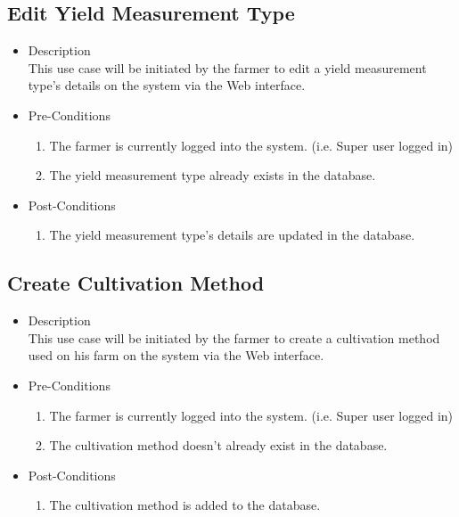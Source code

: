 \documentclass[11pt,fleqn]{book} %
\begin{document}
	\subsection{Edit Yield Measurement Type}
	\begin{itemize}
		\item Description\\
		This use case will be initiated by the farmer to edit a yield measurement type’s details on the system via the Web interface.
		\item Pre-Conditions
		\begin{enumerate}
			\item The farmer is currently logged into the system. (i.e. Super user logged in)
			\item The yield measurement type already exists in the database.					
		\end{enumerate}
		\item Post-Conditions
		\begin{enumerate}
			\item The yield measurement type’s details are updated in the database.
		\end{enumerate}
	\end{itemize}
	
	\subsection{Create Cultivation Method}
	\begin{itemize}
		\item Description\\
		This use case will be initiated by the farmer to create a cultivation method used on his farm on the system via the Web interface.
		\item Pre-Conditions
		\begin{enumerate}
			\item The farmer is currently logged into the system. (i.e. Super user logged in)
			\item The cultivation method doesn’t already exist in the database. 				
		\end{enumerate}
		\item Post-Conditions
		\begin{enumerate}
			\item The cultivation method is added to the database.
		\end{enumerate}
	\end{itemize}
	
\end{document}
